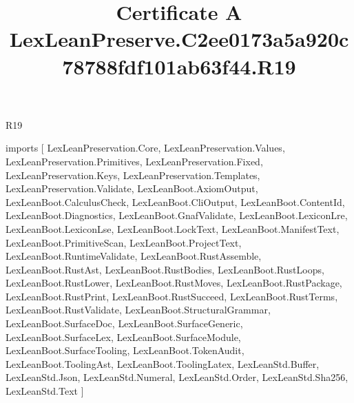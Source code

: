 \begin{lexlean}{R19}
\title{Certificate A LexLeanPreserve.C2ee0173a5a920c78788fdf101ab63f44.R19}
\begin{coremodule}
imports [
  LexLeanPreservation.Core,
  LexLeanPreservation.Values,
  LexLeanPreservation.Primitives,
  LexLeanPreservation.Fixed,
  LexLeanPreservation.Keys,
  LexLeanPreservation.Templates,
  LexLeanPreservation.Validate,
  LexLeanBoot.AxiomOutput,
  LexLeanBoot.CalculusCheck,
  LexLeanBoot.CliOutput,
  LexLeanBoot.ContentId,
  LexLeanBoot.Diagnostics,
  LexLeanBoot.GnafValidate,
  LexLeanBoot.LexiconLre,
  LexLeanBoot.LexiconLse,
  LexLeanBoot.LockText,
  LexLeanBoot.ManifestText,
  LexLeanBoot.PrimitiveScan,
  LexLeanBoot.ProjectText,
  LexLeanBoot.RuntimeValidate,
  LexLeanBoot.RustAssemble,
  LexLeanBoot.RustAst,
  LexLeanBoot.RustBodies,
  LexLeanBoot.RustLoops,
  LexLeanBoot.RustLower,
  LexLeanBoot.RustMoves,
  LexLeanBoot.RustPackage,
  LexLeanBoot.RustPrint,
  LexLeanBoot.RustSucceed,
  LexLeanBoot.RustTerms,
  LexLeanBoot.RustValidate,
  LexLeanBoot.StructuralGrammar,
  LexLeanBoot.SurfaceDoc,
  LexLeanBoot.SurfaceGeneric,
  LexLeanBoot.SurfaceLex,
  LexLeanBoot.SurfaceModule,
  LexLeanBoot.SurfaceTooling,
  LexLeanBoot.TokenAudit,
  LexLeanBoot.ToolingAst,
  LexLeanBoot.ToolingLatex,
  LexLeanStd.Buffer,
  LexLeanStd.Json,
  LexLeanStd.Numeral,
  LexLeanStd.Order,
  LexLeanStd.Sha256,
  LexLeanStd.Text
]


\end{coremodule}
\end{lexlean}
